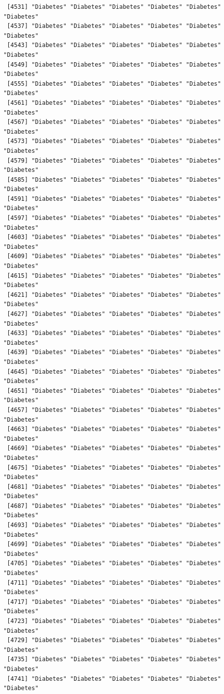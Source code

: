 \documentclass[
  letterpaper,
  DIV=11,
  numbers=noendperiod]{scrartcl}
\begin{document}
\begin{verbatim}
 [4531] "Diabetes" "Diabetes" "Diabetes" "Diabetes" "Diabetes" "Diabetes"
 [4537] "Diabetes" "Diabetes" "Diabetes" "Diabetes" "Diabetes" "Diabetes"
 [4543] "Diabetes" "Diabetes" "Diabetes" "Diabetes" "Diabetes" "Diabetes"
 [4549] "Diabetes" "Diabetes" "Diabetes" "Diabetes" "Diabetes" "Diabetes"
 [4555] "Diabetes" "Diabetes" "Diabetes" "Diabetes" "Diabetes" "Diabetes"
 [4561] "Diabetes" "Diabetes" "Diabetes" "Diabetes" "Diabetes" "Diabetes"
 [4567] "Diabetes" "Diabetes" "Diabetes" "Diabetes" "Diabetes" "Diabetes"
 [4573] "Diabetes" "Diabetes" "Diabetes" "Diabetes" "Diabetes" "Diabetes"
 [4579] "Diabetes" "Diabetes" "Diabetes" "Diabetes" "Diabetes" "Diabetes"
 [4585] "Diabetes" "Diabetes" "Diabetes" "Diabetes" "Diabetes" "Diabetes"
 [4591] "Diabetes" "Diabetes" "Diabetes" "Diabetes" "Diabetes" "Diabetes"
 [4597] "Diabetes" "Diabetes" "Diabetes" "Diabetes" "Diabetes" "Diabetes"
 [4603] "Diabetes" "Diabetes" "Diabetes" "Diabetes" "Diabetes" "Diabetes"
 [4609] "Diabetes" "Diabetes" "Diabetes" "Diabetes" "Diabetes" "Diabetes"
 [4615] "Diabetes" "Diabetes" "Diabetes" "Diabetes" "Diabetes" "Diabetes"
 [4621] "Diabetes" "Diabetes" "Diabetes" "Diabetes" "Diabetes" "Diabetes"
 [4627] "Diabetes" "Diabetes" "Diabetes" "Diabetes" "Diabetes" "Diabetes"
 [4633] "Diabetes" "Diabetes" "Diabetes" "Diabetes" "Diabetes" "Diabetes"
 [4639] "Diabetes" "Diabetes" "Diabetes" "Diabetes" "Diabetes" "Diabetes"
 [4645] "Diabetes" "Diabetes" "Diabetes" "Diabetes" "Diabetes" "Diabetes"
 [4651] "Diabetes" "Diabetes" "Diabetes" "Diabetes" "Diabetes" "Diabetes"
 [4657] "Diabetes" "Diabetes" "Diabetes" "Diabetes" "Diabetes" "Diabetes"
 [4663] "Diabetes" "Diabetes" "Diabetes" "Diabetes" "Diabetes" "Diabetes"
 [4669] "Diabetes" "Diabetes" "Diabetes" "Diabetes" "Diabetes" "Diabetes"
 [4675] "Diabetes" "Diabetes" "Diabetes" "Diabetes" "Diabetes" "Diabetes"
 [4681] "Diabetes" "Diabetes" "Diabetes" "Diabetes" "Diabetes" "Diabetes"
 [4687] "Diabetes" "Diabetes" "Diabetes" "Diabetes" "Diabetes" "Diabetes"
 [4693] "Diabetes" "Diabetes" "Diabetes" "Diabetes" "Diabetes" "Diabetes"
 [4699] "Diabetes" "Diabetes" "Diabetes" "Diabetes" "Diabetes" "Diabetes"
 [4705] "Diabetes" "Diabetes" "Diabetes" "Diabetes" "Diabetes" "Diabetes"
 [4711] "Diabetes" "Diabetes" "Diabetes" "Diabetes" "Diabetes" "Diabetes"
 [4717] "Diabetes" "Diabetes" "Diabetes" "Diabetes" "Diabetes" "Diabetes"
 [4723] "Diabetes" "Diabetes" "Diabetes" "Diabetes" "Diabetes" "Diabetes"
 [4729] "Diabetes" "Diabetes" "Diabetes" "Diabetes" "Diabetes" "Diabetes"
 [4735] "Diabetes" "Diabetes" "Diabetes" "Diabetes" "Diabetes" "Diabetes"
 [4741] "Diabetes" "Diabetes" "Diabetes" "Diabetes" "Diabetes" "Diabetes"

\end{verbatim}
\end{document}
